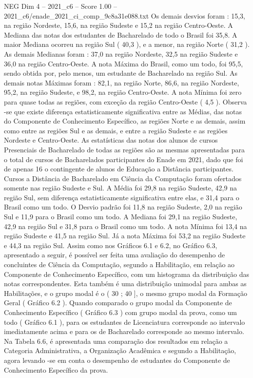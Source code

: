 \begin{textsample}{NEG Dim 4 – 2021\_c6 – Score 1.00 – 2021\_c6/enade\_2021\_ci\_comp\_9c8a31e088.txt}
Os demais desvios foram : 15,3, na região Nordeste, 15,6, na região Sudeste e 15,2 na região Centro-Oeste.
A Mediana das notas dos estudantes de Bacharelado de todo o Brasil foi 35,8.
A maior Mediana ocorreu na região Sul ( 40,3 ), e a menor, na região Norte ( 31,2 ).
As demais Medianas foram : 37,0 na região Nordeste, 32,5 na região Sudeste e 36,0 na região Centro-Oeste.
A nota Máxima do Brasil, como um todo, foi 95,5, sendo obtida por, pelo menos, um estudante de Bacharelado na região Sul.
As demais notas Máximas foram : 82,1, na região Norte, 86,6, na região Nordeste, 95,2, na região Sudeste, e 98,2, na região Centro-Oeste.
A nota Mínima foi zero para quase todas as regiões, com exceção da região Centro-Oeste ( 4,5 ).
Observa -se que existe diferença estatisticamente significativa entre as Médias, das notas do Componente de Conhecimento Específico, as regiões Norte e as demais, assim como entre as regiões Sul e as demais, e entre a região Sudeste e as regiões Nordeste e Centro-Oeste.
As estatísticas das notas dos alunos de cursos Presenciais de Bacharelado de todas as regiões são as mesmas apresentadas para o total de cursos de Bacharelados participantes do Enade em 2021, dado que foi de apenas 16 o contingente de alunos de Educação a Distância participantes.
Cursos a Distância de Bacharelado em Ciência da Computação foram ofertados somente nas região Sudeste e Sul.
A Média foi 29,8 na região Sudeste, 42,9 na região Sul, sem diferença estatisticamente significativa entre elas, e 31,4 para o Brasil como um todo.
O Desvio padrão foi 11,8 na região Sudeste, 2,0 na região Sul e 11,9 para o Brasil como um todo.
A Mediana foi 29,1 na região Sudeste, 42,9 na região Sul e 31,8 para o Brasil como um todo.
A nota Mínima foi 13,4 na região Sudeste e 41,5 na região Sul.
Já a nota Máxima foi 53,2 na região Sudeste e 44,3 na região Sul.
Assim como nos Gráficos 6.1 e 6.2, no Gráfico 6.3, apresentado a seguir, é possível ser feita uma avaliação do desempenho de concluintes de Ciência da Computação, segundo a Habilitação, em relação ao Componente de Conhecimento Específico, com um histograma da distribuição das notas correspondentes.
Esta também é uma distribuição unimodal para ambas as Habilitações, e o grupo modal é o ( 30 ; 40 ], o mesmo grupo modal da Formação Geral ( Gráfico 6.2 ).
Quando comparado o grupo modal da Componente de Conhecimento Específico ( Gráfico 6.3 ) com grupo modal da prova, como um todo ( Gráfico 6.1 ), para os estudantes de Licenciatura corresponde ao intervalo imediatamente acima e para os de Bacharelado corresponde ao mesmo intervalo.
Na Tabela 6.6, é apresentada uma comparação dos resultados em relação a Categoria Administrativa, a Organização Acadêmica e segundo a Habilitação, agora levando -se em conta o desempenho de estudantes do Componente de Conhecimento Específico da prova.

\end{textsample}
